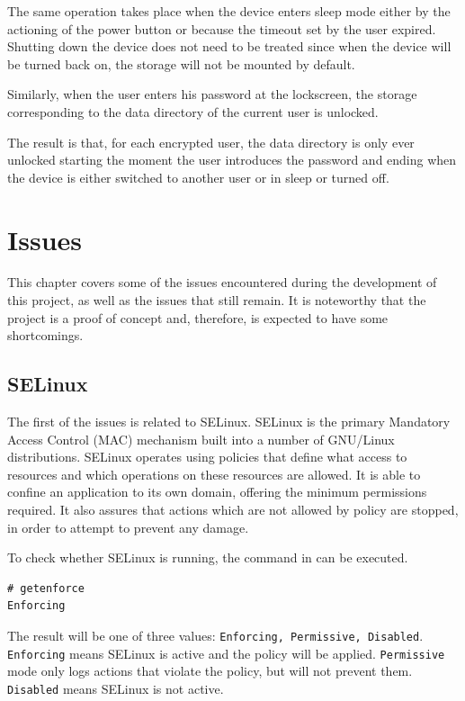 The same operation takes place when the device enters sleep mode either by the actioning of the power button or because the timeout set by the user expired. Shutting down the device does not need to be treated since when the device will be turned back on, the storage will not be mounted by default.

Similarly, when the user enters his password at the lockscreen, the storage corresponding to the data directory of the current user is unlocked.

The result is that, for each encrypted user, the data directory is only ever unlocked starting the moment the user introduces the password and ending when the device is either switched to another user or in sleep or turned off.

\section{Issues}
\label{sec:issues-multi-user}

This chapter covers some of the issues encountered during the development of this project, as well as the issues that still remain. It is noteworthy that the project is a proof of concept and, therefore, is expected to have some shortcomings.

\subsection{SELinux}
\label{sub-sec:selinux-multi-user}

The first of the issues is related to SELinux. SELinux is the primary Mandatory Access Control (MAC) mechanism built into a number of GNU/Linux distributions. SELinux operates using policies that define what access to resources and which operations on these resources are allowed. It is able to confine an application to its own domain, offering the minimum permissions required. It also assures that actions which are not allowed by policy are stopped, in order to attempt to prevent any damage.

To check whether SELinux is running, the command in  can be executed.

\begin{lstlisting}[numbers=none, caption=Checking SELinux status, label=lst:selinux-multi-user]
# getenforce
Enforcing
\end{lstlisting}
The result will be one of three values: \texttt{Enforcing, Permissive, Disabled}. \texttt{Enforcing} means SELinux is active and the policy will be applied. \texttt{Permissive} mode only logs actions that violate the policy, but will not prevent them. \texttt{Disabled} means SELinux is not active.

